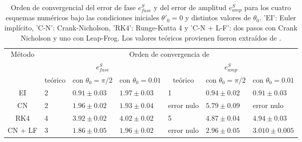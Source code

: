 \documentclass[aps,prb,twocolumn,superscriptaddress,floatfix,longbibliography,10pt]{revtex4-2}
\newcounter{para}
\begin{document}
\twocolumngrid



\onecolumngrid


\begin{table}[]
  \begin{tabular}{|c|llllll|}
  \hline
  \multirow{3}{*}{Método} &
    \multicolumn{6}{c|}{Orden de convergencia de} \\ \cline{2-7} 
   &
    \multicolumn{3}{c|}{$e^S_{fase}$} &
    \multicolumn{3}{c|}{$e^S_{amp}$} \\ \cline{2-7} 
   &
    \multicolumn{1}{c|}{teórico} &
    \multicolumn{1}{c|}{con $\theta_0 = \pi/2$} &
    \multicolumn{1}{c|}{con $\theta_0 = 0.01$} &
    \multicolumn{1}{c|}{teórico} &
    \multicolumn{1}{c|}{con $\theta_0 = \pi/2$} &
    \multicolumn{1}{c|}{con $\theta_0 = 0.01$} \\ \hline
  EI &
    \multicolumn{1}{l|}{2} &
    \multicolumn{1}{l|}{$0.91 \pm 0.03$} &
    \multicolumn{1}{l|}{$1.97 \pm 0.03$} &
    \multicolumn{1}{l|}{1} &
    \multicolumn{1}{l|}{$0.94 \pm 0.02$} &
    $0.91 \pm 0.03$ \\ \hline
  CN &
    \multicolumn{1}{l|}{2} &
    \multicolumn{1}{l|}{$1.96 \pm 0.02$} &
    \multicolumn{1}{l|}{$1.93 \pm 0.04$} &
    \multicolumn{1}{l|}{error nulo} &
    \multicolumn{1}{l|}{$5.79 \pm 0.09$} &
    error nulo \\ \hline
  RK4 &
    \multicolumn{1}{l|}{4} &
    \multicolumn{1}{l|}{$3.92 \pm 0.02$} &
    \multicolumn{1}{l|}{$4.02 \pm 0.02$} &
    \multicolumn{1}{l|}{5} &
    \multicolumn{1}{l|}{$4.87 \pm 0.04$} &
    $4.94 \pm 0.03$ \\ \hline
  CN + LF &
    \multicolumn{1}{l|}{3} &
    \multicolumn{1}{l|}{$1.86 \pm 0.05$} &
    \multicolumn{1}{l|}{$1.96 \pm 0.02$} &
    \multicolumn{1}{l|}{error nulo} &
    \multicolumn{1}{l|}{$2.96 \pm 0.05$} &
    $3.010 \pm 0.005$ \\ \hline
  \end{tabular}
  \caption{\label{tabla:simple_errores} Orden de convergencial del error de fase $e^S_{fase}$ y del error de amplitud $e^S_{amp}$ para los cuatro esquemas numéricos bajo las condiciones iniciales $\theta'_0 = 0$ y distintos valores de $\theta_0$. 'EI': Euler implícito, 'C-N': Crank-Nicholson, 'RK4': Runge-Kutta 4 y 'C-N + L-F': dos pasos con Crank Nicholson y uno con Leap-Frog. Los valores teóricos provienen fueron extraídos de \cite{Notas_materia}.}
  \end{table}
\end{document}
